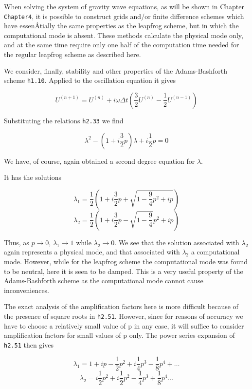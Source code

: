 When solving the system of gravity wave equations, as will be shown in
Chapter \texttt{Chapter4}, it is possible to construct grids and/or
finite difference schemes which have essenÂ­tially the same properties as
the leapfrog scheme, but in which the computational mode is absent.
These methods calculate the physical mode only, and at the same time
require only one half of the computation time needed for the regular
leapfrog scheme as described here.

We consider, finally, stability and other properties of the
Adams-Bashforth scheme \texttt{h1.10}. Applied to the oscillation
equation it gives

{\[U^{( n + 1 )} = U^{(n)} + i\omega\Delta t \left( \frac{3}{2}U^{( n )} - \frac{1}{2}U^{\left( n - 1 \right)} \right)\]}

Substituting the relations \texttt{h2.33} we find

\[\lambda^{2} - \left( 1 + i\frac{3}{2}p \right)\lambda + i\frac{1}{2}p = 0\]

We have, of course, again obtained a second degree equation for
\(\lambda\).

It has the solutions

{\[\lambda_{1} = \frac{1}{2}\left( 1 + i\frac{3}{2}p + \sqrt{1 - \frac{9}{4}p^{2} + ip} \right)\]\[\lambda_{2} = \frac{1}{2}\left( 1 + i\frac{3}{2}p - \sqrt{1 - \frac{9}{4}}p^{2} + ip \right)\]}

Thus, as \(p \rightarrow 0\), \(\lambda_{1} \rightarrow 1 \) while
\(\lambda_{2} \rightarrow 0\). We see that the solution associated with
\(\lambda_{2}\) again represents a physical mode, and that associated
with \(\lambda_{2}\) a computational mode. However, while for the
leapfrog scheme the computational mode was found to be neutral, here it
is seen to be damped. This is a very useful property of the
Adams-Bashforth scheme as the computational mode cannot cause
inconveniences.

The exact analysis of the amplification factors here is more difficult
because of the presence of square roots in \texttt{h2.51}. However,
since for reasons of accuracy we have to choose a relatively small value
of p in any case, it will suffice to consider amplification factors for
small values of p only. The power series expansion of \texttt{h2.51}
then gives

\[\lambda_{1} = 1 + ip - \frac{1}{2}p^{2} + i\frac{1}{4}p^{3} - \frac{1}{8}p^{4} + \ldots\]\[\lambda_{2} = i\frac{1}{2}p^{2} + i\frac{1}{2}p^{2} - \frac{1}{4}p^{3} + \frac{1}{8}p^{4}\ldots\]


